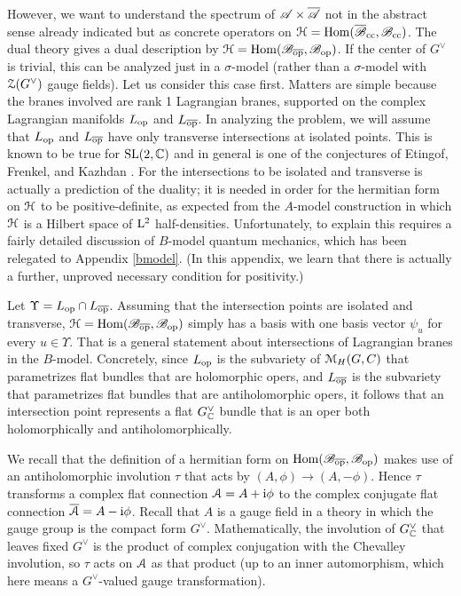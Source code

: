 \documentclass[11pt,a4paper]{article}
\begin{document}
However, we want to understand the spectrum of ${\mathscr A}\times \overline{\mathscr A}$ not in the abstract sense already indicated but as concrete operators on
${\mathcal H}={\mathrm{Hom}}({\overline {\mathscr B}}_{\mathrm{cc}},{\mathscr B}_{\mathrm{cc}})$.   The dual theory gives a dual description by ${\mathcal H}={\mathrm{Hom}}({\mathscr B}_{\overline{\mathrm{op}}},{\mathscr B}_{\mathrm{op}})$.   If the center of $G^\vee$ is trivial,
this can be analyzed just in a $\sigma$-model (rather than a $\sigma$-model with ${\mathcal Z}(G^\vee)$ gauge fields).   Let us consider this case first.   
Matters are simple because
 the branes involved are  rank 1 Lagrangian branes, supported on the complex Lagrangian manifolds $L_{\mathrm{op}}$ and $L_{\overline{\mathrm{op}}}$.   In analyzing the problem,
 we will assume that $L_{\mathrm{op}}$ and $L_{\overline{\mathrm{op}}}$ have only transverse intersections at isolated points.   This is known to 
be true for ${\mathrm{SL}}(2,{\mathbb C})$ and in general is one of the conjectures of Etingof, Frenkel, and Kazhdan \cite{EFK,EFK2}.     For the intersections to be isolated
and transverse is actually a prediction of the duality; it is needed in order for the hermitian form on ${\mathcal H}$ to be positive-definite, as expected from the $A$-model
construction in which ${\mathcal H}$ is a Hilbert space of ${\mathrm L}^2$ half-densities.  Unfortunately, to explain this requires a fairly detailed discussion of $B$-model quantum 
mechanics, which has been relegated to Appendix \ref{bmodel}.   (In this appendix, we learn that there is actually a further, unproved necessary condition for positivity.) 



Let $\Upsilon=L_{\mathrm{op}}\cap L_{\overline{\mathrm{op}}}$.  Assuming that the intersection points are isolated and transverse,  
${\mathcal H}={\mathrm{Hom}}({\mathscr B}_{\overline{\mathrm{op}}},{\mathscr B}_{\mathrm{op}})$ simply has a basis with one
basis vector $\psi_u$ for every $u\in \Upsilon$. That is a general statement about intersections of Lagrangian branes in the $B$-model.   Concretely,
since $L_{\mathrm{op}}$ is the subvariety of ${\mathcal M}_H(G,C)$ that parametrizes flat  bundles that
are holomorphic opers, and $L_{\overline{\mathrm{op}}}$ is the subvariety that parametrizes flat  bundles that are antiholomorphic opers, it follows that
an intersection point represents a flat $G_{\mathbb C}^\vee$ bundle  that is an oper both holomorphically and antiholomorphically.    

We recall that the definition of a hermitian form on ${\mathrm{Hom}}({\mathscr B}_{\overline{\mathrm{op}}},{\mathscr B}_{\mathrm{op}})$ makes use of an antiholomorphic involution $\tau$ that acts by $(A,\phi)\to
(A,-\phi)$.    Hence $\tau$ transforms a complex flat connection ${\mathcal A}=A+{\mathrm i}\phi$ to the complex conjugate flat connection $\overline{{\mathcal A}}=A-{\mathrm i}\phi$.   Recall that $A$ is
a gauge field in a theory in which the gauge group is the compact form $G^\vee$.  Mathematically, the involution of $G^\vee_{\mathbb C}$ that leaves fixed $G^\vee$ is the product
of complex conjugation with the
Chevalley involution, so $\tau$ acts on ${\mathcal A}$ as that product  (up to an inner automorphism, which here means a $G^\vee$-valued gauge transformation).  
\end{document}

